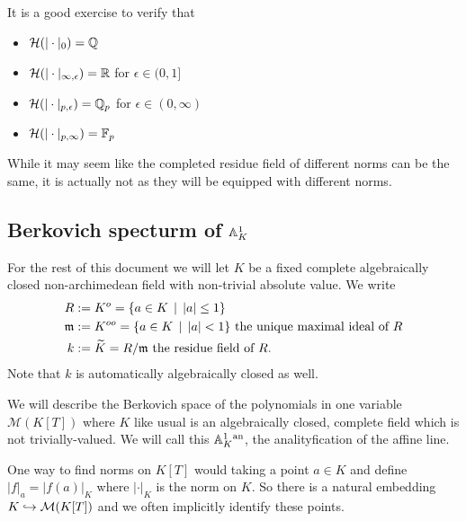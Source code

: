 It is a good exercise to verify that 
\begin{itemize}
	\item  $\mathcal{H}(|\cdot |_0) = \mathbb{Q}$ 
	\item $\mathcal{H} (|\cdot |_{\infty, \epsilon}) = \mathbb{R}$ for $\epsilon \in (0, 1]$
	\item $\mathcal{H} (|\cdot |_{p, \epsilon}) = \mathbb{Q}_p$ for $\epsilon \in (0, \infty)$
	\item $\mathcal{H} (|\cdot |_{p, \infty}) = \mathbb{F}_p$ 
\end{itemize}
While it may seem like the completed residue field of different norms can be the same, it is actually not as they will be equipped with different norms.  


\subsection{Berkovich specturm of $\mathbb{A}^{1}_K$} \label{sec:berkovich_specturm_of_affine_line}


For the rest of this document we will let $K$ be a fixed complete algebraically closed non-archimedean field with non-trivial absolute value. We write 
\begin{align*}
	R &:= K^{o} = \{a \in K \st |a| \le 1\} \\
	\mathfrak{m}  &:= K^{oo} =  \{a \in K \st |a| < 1\}  \text{ the unique maximal ideal of } R\\
	k &:= \widetilde K = R / \mathfrak{m} \text{ the residue field of } R
.\end{align*}
Note that $k$ is automatically algebraically closed as well. 

\medskip

We will describe the Berkovich space of the polynomials in one variable  $\mathcal{M} (K[T])$ where $K$ like usual is an algebraically closed, complete field which is not trivially-valued. 
We will call this $\mathbb{A}_K^{1}{}^{\text{an}}$, the analityfication of the affine line. 

One way to find norms on $K[T]$ would taking a point $a \in K$ and define $|f|_a = |f(a)|_K$ where $|\cdot |_K$ is the norm on $K$. 
So there is a natural embedding $K \hookrightarrow \mathcal{M}(K[T])$ and we often implicitly identify these points.  

